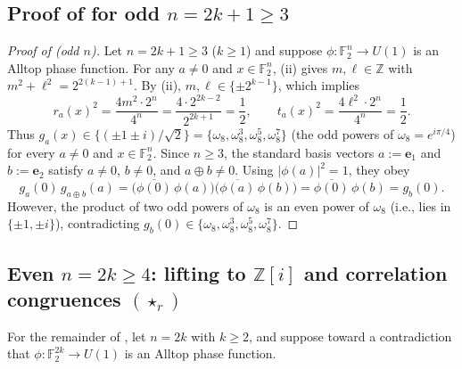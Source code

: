 \documentclass[11pt,a4paper]{article}
\theoremstyle{plain}
\theoremstyle{definition}
\theoremstyle{remark}
\newcommand{\Z}{\mathbb{Z}}
\newcommand{\F}{\mathbb{F}}
\newcommand{\Zi}{\mathbb{Z}[i]}
\newcommand{\Uone}{U(1)}
\newcommand{\abs}[1]{\lvert#1\rvert}
\numberwithin{equation}{section}
\begin{document}
\subsection{Proof of \texorpdfstring{}{Theorem 1} for odd \texorpdfstring{$n = 2k + 1 \ge 3$}{n = 2k + 1 >= 3}}\label{sec:alltop-odd}

\begin{proof}[Proof of  (odd $n$)]
Let $n = 2k + 1 \ge 3$ ($k \ge 1$) and suppose $\phi : \F_2^n \to \Uone$ is an Alltop phase function. For any $a \neq 0$ and $x \in \F_2^n$, (ii) gives $m, \ell \in \Z$ with $m^2 + \ell^2 = 2^{2(k-1)+1}$. By (ii), $m, \ell \in \{\pm 2^{k-1}\}$, which implies
\[
  r_a(x)^2 = \frac{4 m^2 \cdot 2^n}{4^n} = \frac{4 \cdot 2^{2k-2}}{2^{2k+1}} = \frac{1}{2},
  \qquad
  t_a(x)^2 = \frac{4 \ell^2 \cdot 2^n}{4^n} = \frac{1}{2}.
\]
Thus $g_a(x) \in \{(\pm 1 \pm i)/\sqrt{2}\} = \{\omega_8, \omega_8^3, \omega_8^5, \omega_8^7\}$ (the odd powers of $\omega_8 = e^{i\pi/4}$) for every $a \neq 0$ and $x \in \F_2^n$. Since $n \ge 3$, the standard basis vectors $a := \mathbf{e}_1$ and $b := \mathbf{e}_2$ satisfy $a \neq 0$, $b \neq 0$, and $a \oplus b \neq 0$. Using $\abs{\phi(a)}^2 = 1$, they obey
\[
  g_a(0)\,g_{a \oplus b}(a) = \bigl(\overline{\phi(0)}\,\phi(a)\bigr)\bigl(\overline{\phi(a)}\,\phi(b)\bigr) = \overline{\phi(0)}\,\phi(b) = g_b(0).
\]
However, the product of two odd powers of $\omega_8$ is an even power of $\omega_8$ (i.e., lies in $\{\pm 1, \pm i\}$), contradicting $g_b(0) \in \{\omega_8, \omega_8^3, \omega_8^5, \omega_8^7\}$.
\end{proof}

\subsection{Even \texorpdfstring{$n = 2k \ge 4$}{n = 2k >= 4}: lifting to \texorpdfstring{$\Zi$}{Z[i]} and correlation congruences \texorpdfstring{$(\star_r)$}{(*\_r)}}\label{sec:alltop-even}

For the remainder of , let $n = 2k$ with $k \ge 2$, and suppose toward a contradiction that $\phi : \F_2^{2k} \to \Uone$ is an Alltop phase function.
\end{document}
